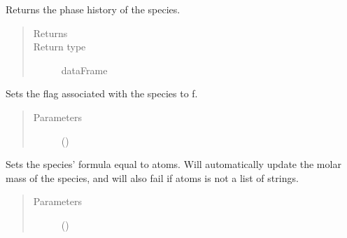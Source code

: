 \documentclass[letterpaper,10pt,openany,oneside,english]{sphinxmanual}
\begin{document}
\begin{fulllineitems}

\begin{fulllineitems}
\label{\detokenize{support_rst/specie:specie.Specie.GetPhase}}
Returns the phase history of the species.
\begin{quote}\begin{description}
\item[{Returns}] \leavevmode
{}

\item[{Return type}] \leavevmode
dataFrame

\end{description}\end{quote}

\end{fulllineitems}


\begin{fulllineitems}
\label{\detokenize{support_rst/specie:specie.Specie.SetAtoms}}
\end{fulllineitems}


\begin{fulllineitems}
\label{\detokenize{support_rst/specie:specie.Specie.SetFlag}}
Sets the flag associated with the species to f.
\begin{quote}\begin{description}
\item[{Parameters}] \leavevmode
{} () \textendash{} 

\end{description}\end{quote}

\end{fulllineitems}


\begin{fulllineitems}
\label{\detokenize{support_rst/specie:specie.Specie.SetFormula}}
Sets the species’ formula equal to atoms. Will automatically update
the molar mass of the species, and will also fail if atoms is not a
list of strings.
\begin{quote}\begin{description}
\item[{Parameters}] \leavevmode
{} () \textendash{} 


\end{description}
\end{quote}
\end{fulllineitems}
\end{fulllineitems}
\end{document}
